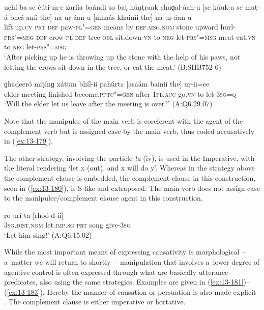 \begin{exe}
\ex
\label{ex:13-178}
\gll uc̣hí ba se čúti-m-e zaríia baándi  so baṭ húṇṭraak c̣huɡal-áan-u [se kúuk-a se muṭ-á bheš-aníi the] na  uṛ-áan-u \textsc{[}mhaás
  khainíi the] na uṛ-áan-u \\
lift.up.\textsc{cv} \textsc{prt} \textsc{def} paw-\textsc{pl"=gen} means by  \textsc{def.msg.nom} stone upward hurl-\textsc{prs"=msg}  \textsc{def} crow-\textsc{pl} \textsc{def} tree-\textsc{obl} sit.down-\textsc{vn} to \textsc{neg} let-\textsc{prs"=msg} meat eat.\textsc{vn} to \textsc{neg} let-\textsc{prs"=msg} \\
\glt `After picking up he is throwing up the stone with the help of his paws, not letting the crows sit down in the tree, or eat the meat.' (B:SHB752-6)

\ex
\label{ex:13-179}
\gll ɡhaḍeeró miṭínɡ xátum bhíl-ii pahúrta [asaám  bainií the] uṛ-íi=ee \\
elder meeting finished become.\textsc{pptc"=gen} after \textsc{1pl.acc} go.\textsc{vn} to let-\textsc{3sg=q} \\
\glt `Will the elder let us leave after the meeting is over?' (A:Q6.29.07) 
\end{exe}

Note that the manipulee of the main verb is coreferent with the agent of the complement verb but is assigned case by the main verb, thus coded accusatively in (\ref{ex:13-179}).


The other strategy, involving the particle \textit{ta} (iv), is used in the Imperative, with the literal rendering `let x (out), and x will do y'. Whereas in the strategy above the complement clause is embedded, the complement clause in this construction, seen in (\ref{ex:13-180}), is S-like and extraposed. The main verb does not assign case to the manipulee/complement clause agent in this construction.

\begin{exe}
\ex
\label{ex:13-180}
\gll ṛo uṛí ta [rhoó d-íi] \\
\textsc{3sg.dist.nom} let.\textsc{imp.sg} \textsc{ prt} song give-\textsc{3sg} \\
\glt `Let him sing!' (A:Q6.15.02) 
\end{exe}

 While the most important means of expressing causativity is morphological~-- a~matter we will return to shortly~-- manipulation that involves a~lower degree of agentive control \citep[45]{givon2001b} is often expressed through what are basically utterance predicates, also using the same strategies. Examples are given in (\ref{ex:13-181})--(\ref{ex:13-183}). Hereby the manner of causation or persuation is also made explicit \citep[136]{noonan2007}. The complement clause is either imperative or hortative.

